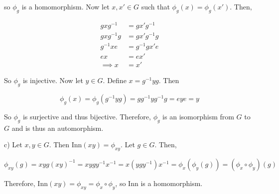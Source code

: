 \documentclass{article}
\begin{document}
so $\phi_g$ is a homomorphism. Now let $x, x' \in G$ such that $\phi_g(x) = \phi_g(x')$. Then,

\begin{align*}
    gxg^{-1} &= gx'g^{-1}\\
    gxg^{-1}g &= gx'g^{-1}g\\
    g^{-1}xe &= g^{-1}gx'e\\
    ex &= ex'\\
    \implies x &= x'
\end{align*}

So $\phi_g$ is injective. Now let $y \in G$. Define $x = g^{-1}yg$. Then

\begin{equation*}
    \phi_g(x) = \phi_g(g^{-1}yg) = gg^{-1}yg^{-1}g = eye = y
\end{equation*}

So $\phi_g$ is surjective and thus bijective. Therefore, $\phi_g$ is an isomorphism from $G$ to $G$ and is thus an automorphism.

\hfill \break
c) Let $x, y \in G$. Then Inn$(xy) = \phi_{xy}$. Let $g \in G$. Then,

\begin{equation*}
    \phi_{xy}(g) = xyg(xy)^{-1} = xygy^{-1}x^{-1} = x(ygy^{-1})x^{-1} = \phi_x(\phi_y(g)) = (\phi_x \circ \phi_y)(g)
\end{equation*}

Therefore, Inn$(xy) = \phi_{xy} = \phi_x \circ \phi_y$, so Inn is a homomorphism.
\end{document}
